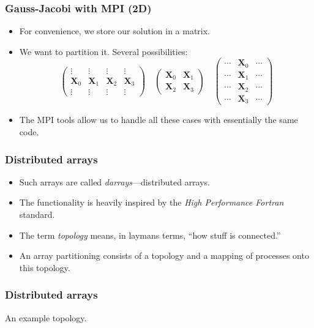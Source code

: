 \begin{frame}
  \frametitle{Gauss-Jacobi with MPI (2D)}
  \begin{itemize}
  \item For convenience, we store our solution in a matrix.
  \item We want to partition it. Several possibilities:
    \[
      \begin{pmatrix}
        \vdots & \vdots & \vdots & \vdots \\
        \bm X_0 & \bm X_1 & \bm X_2 & \bm X_3 \\
        \vdots & \vdots & \vdots & \vdots
      \end{pmatrix}
      \quad
      \begin{pmatrix}
        \bm X_0 & \bm X_1 \\
        \bm X_2 & \bm X_3
      \end{pmatrix}
      \quad
      \begin{pmatrix}
        \cdots & \bm X_0 & \cdots \\
        \cdots & \bm X_1 & \cdots \\
        \cdots & \bm X_2 & \cdots \\
        \cdots & \bm X_3 & \cdots
      \end{pmatrix}
    \]
  \item The MPI tools allow us to handle all these cases with essentially the
    same code.
  \end{itemize}
\end{frame}

\begin{frame}
  \frametitle{Distributed arrays}
  \begin{itemize}
  \item Such arrays are called \emph{darrays}---distributed arrays.
  \item The functionality is heavily inspired by the \emph{High Performance
      Fortran} standard.
  \item The term \emph{topology} means, in laymans terms, ``how stuff is
    connected.''
  \item An array partitioning consists of a topology and a mapping of processes
    onto this topology.
  \end{itemize}
\end{frame}

\begin{frame}
  \frametitle{Distributed arrays}
  An example topology.
  \begin{center}
  \end{center}
\end{frame}

